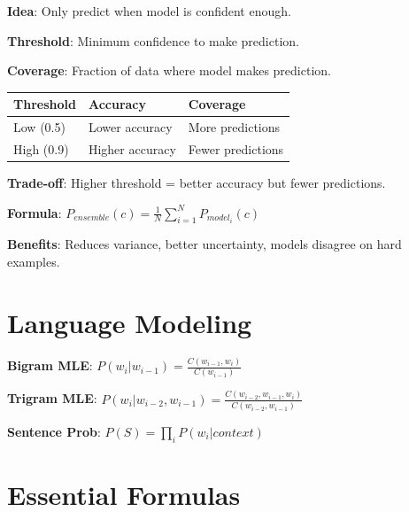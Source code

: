\documentclass[11pt,a4paper]{article}
\begin{document}
\begin{definitionbox}

\textbf{Idea}: Only predict when model is confident enough.

\textbf{Threshold}: Minimum confidence to make prediction.

\textbf{Coverage}: Fraction of data where model makes prediction.

\begin{tabular}{@{}l|l|l@{}}
\textbf{Threshold} & \textbf{Accuracy} & \textbf{Coverage} \\
\hline
Low (0.5) & Lower accuracy & More predictions \\
High (0.9) & Higher accuracy & Fewer predictions \\
\end{tabular}

\textbf{Trade-off}: Higher threshold = better accuracy but fewer predictions.
\end{definitionbox}

\begin{notebox}

\textbf{Formula}: $P_{ensemble}(c) = \frac{1}{N}\sum_{i=1}^{N} P_{model_i}(c)$

\textbf{Benefits}: Reduces variance, better uncertainty, models disagree on hard examples.
\end{notebox}

\section{Language Modeling}

\begin{definitionbox}

\textbf{Bigram MLE}: $P(w_i | w_{i-1}) = \frac{C(w_{i-1}, w_i)}{C(w_{i-1})}$

\textbf{Trigram MLE}: $P(w_i | w_{i-2}, w_{i-1}) = \frac{C(w_{i-2}, w_{i-1}, w_i)}{C(w_{i-2}, w_{i-1})}$

\textbf{Sentence Prob}: $P(S) = \prod_{i} P(w_i | context)$
\end{definitionbox}

\section{Essential Formulas}
\end{document}
